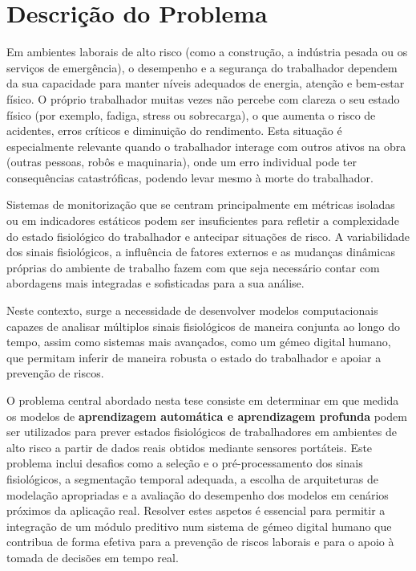 \section{Descrição do Problema}
\label{sec:problema}

Em ambientes laborais de alto risco (como a construção, a indústria pesada ou os serviços de emergência), o desempenho e a segurança do trabalhador dependem da sua capacidade para manter níveis adequados de energia, atenção e bem-estar físico. O próprio trabalhador muitas vezes não percebe com clareza o seu estado físico (por exemplo, fadiga, stress ou sobrecarga), o que aumenta o risco de acidentes, erros críticos e diminuição do rendimento. Esta situação é especialmente relevante quando o trabalhador interage com outros ativos na obra (outras pessoas, robôs e maquinaria), onde um erro individual pode ter consequências catastróficas, podendo levar mesmo à morte do trabalhador.

Sistemas de monitorização que se centram principalmente em métricas isoladas ou em indicadores estáticos podem ser insuficientes para refletir a complexidade do estado fisiológico do trabalhador e antecipar situações de risco. A variabilidade dos sinais fisiológicos, a influência de fatores externos e as mudanças dinâmicas próprias do ambiente de trabalho fazem com que seja necessário contar com abordagens mais integradas e sofisticadas para a sua análise.

Neste contexto, surge a necessidade de desenvolver modelos computacionais capazes de analisar múltiplos sinais fisiológicos de maneira conjunta ao longo do tempo, assim como sistemas mais avançados, como um gémeo digital humano, que permitam inferir de maneira robusta o estado do trabalhador e apoiar a prevenção de riscos.

O problema central abordado nesta tese consiste em determinar em que medida os modelos de \textbf{aprendizagem automática e aprendizagem profunda} podem ser utilizados para prever estados fisiológicos de trabalhadores em ambientes de alto risco a partir de dados reais obtidos mediante sensores portáteis. Este problema inclui desafios como a seleção e o pré-processamento dos sinais fisiológicos, a segmentação temporal adequada, a escolha de arquiteturas de modelação apropriadas e a avaliação do desempenho dos modelos em cenários próximos da aplicação real. Resolver estes aspetos é essencial para permitir a integração de um módulo preditivo num sistema de gémeo digital humano que contribua de forma efetiva para a prevenção de riscos laborais e para o apoio à tomada de decisões em tempo real.

